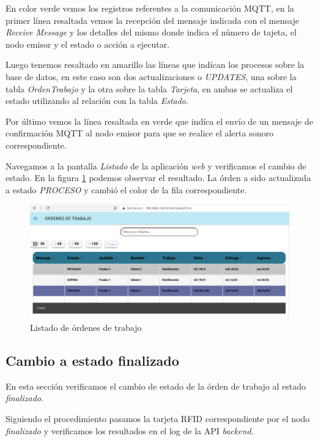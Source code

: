 En color verde vemos los registros referentes a la comunicación MQTT, en la primer línea resaltada vemos la recepción del mensaje indicada con el mensaje \textit{Receive Message} y los detalles del mismo donde indica el número de tajeta, el nodo emisor y el estado o acción a ejecutar.

Luego tenemos resaltado en amarillo las líneas que indícan los procesos sobre la base de datos, en este caso son dos actualizaciones o \textit{UPDATES}, una sobre la tabla \textit{OrdenTrabajo} y la otra sobre la tabla \textit{Tarjeta}, en ambas se actualiza el estado utilizando al relación con la tabla \textit{Estado}.

Por último vemos la línea resaltada en verde que indíca el envío de un mensaje de confirmación MQTT al nodo emisor para que se realice el alerta sonoro correspondiente.

Navegamos a la pantalla \textit{Listado} de la aplicación \textit{web} y verificamos el cambio de estado. En la figura \ref{fig:ensayolistadoweb} podemos observar el resultado. La órden a sido actualizada a estado \textit{PROCESO} y cambió el color de la fila correspondiente.

\begin{figure}[H]
	\centering
	\includegraphics[width=\textwidth]{./Figures/ensayo-1/12.cambioestado-listado.png}
	\caption{Listado de órdenes de trabajo}
	\label{fig:ensayolistadoweb}
\end{figure}

\subsection{Cambio a estado finalizado}
\label{subsec:ensayoafinalizado}

En esta sección verificamos el cambio de estado de la órden de trabajo al estado \textit{finalizado}.

Siguiendo el procedimiento pasamos la tarjeta RFID correspondiente por el nodo \textit{finalizado} y verificamos los resultados en el log de la API \textit{backend}.

